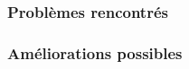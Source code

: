 \begin{frame}
	\frametitle{Problèmes rencontrés}
\end{frame}

\begin{frame}
	\frametitle{Améliorations possibles}
\end{frame}